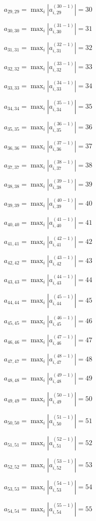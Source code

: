 \documentclass[a4paper,12pt]{article}
\begin{document}
$a _{ 29, 29 } =  \max _i |a _{ i, 29 } ^{ (30 - 1) } | = 30$

$a _{ 30, 30 } =  \max _i |a _{ i, 30 } ^{ (31 - 1) } | = 31$

$a _{ 31, 31 } =  \max _i |a _{ i, 31 } ^{ (32 - 1) } | = 32$

$a _{ 32, 32 } =  \max _i |a _{ i, 32 } ^{ (33 - 1) } | = 33$

$a _{ 33, 33 } =  \max _i |a _{ i, 33 } ^{ (34 - 1) } | = 34$

$a _{ 34, 34 } =  \max _i |a _{ i, 34 } ^{ (35 - 1) } | = 35$

$a _{ 35, 35 } =  \max _i |a _{ i, 35 } ^{ (36 - 1) } | = 36$

$a _{ 36, 36 } =  \max _i |a _{ i, 36 } ^{ (37 - 1) } | = 37$

$a _{ 37, 37 } =  \max _i |a _{ i, 37 } ^{ (38 - 1) } | = 38$

$a _{ 38, 38 } =  \max _i |a _{ i, 38 } ^{ (39 - 1) } | = 39$

$a _{ 39, 39 } =  \max _i |a _{ i, 39 } ^{ (40 - 1) } | = 40$

$a _{ 40, 40 } =  \max _i |a _{ i, 40 } ^{ (41 - 1) } | = 41$

$a _{ 41, 41 } =  \max _i |a _{ i, 41 } ^{ (42 - 1) } | = 42$

$a _{ 42, 42 } =  \max _i |a _{ i, 42 } ^{ (43 - 1) } | = 43$

$a _{ 43, 43 } =  \max _i |a _{ i, 43 } ^{ (44 - 1) } | = 44$

$a _{ 44, 44 } =  \max _i |a _{ i, 44 } ^{ (45 - 1) } | = 45$

$a _{ 45, 45 } =  \max _i |a _{ i, 45 } ^{ (46 - 1) } | = 46$

$a _{ 46, 46 } =  \max _i |a _{ i, 46 } ^{ (47 - 1) } | = 47$

$a _{ 47, 47 } =  \max _i |a _{ i, 47 } ^{ (48 - 1) } | = 48$

$a _{ 48, 48 } =  \max _i |a _{ i, 48 } ^{ (49 - 1) } | = 49$

$a _{ 49, 49 } =  \max _i |a _{ i, 49 } ^{ (50 - 1) } | = 50$

$a _{ 50, 50 } =  \max _i |a _{ i, 50 } ^{ (51 - 1) } | = 51$

$a _{ 51, 51 } =  \max _i |a _{ i, 51 } ^{ (52 - 1) } | = 52$

$a _{ 52, 52 } =  \max _i |a _{ i, 52 } ^{ (53 - 1) } | = 53$

$a _{ 53, 53 } =  \max _i |a _{ i, 53 } ^{ (54 - 1) } | = 54$

$a _{ 54, 54 } =  \max _i |a _{ i, 54 } ^{ (55 - 1) } | = 55$
\end{document}
